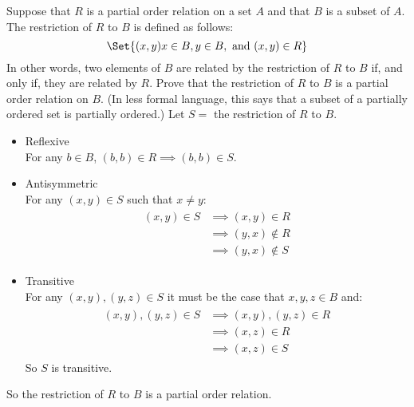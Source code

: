\documentclass[paper=a4, fontsize=11pt]{jhwhw} %
\providecommand\given{} %
\begin{document}
Suppose that $R$ is a partial order relation on a set $A$ and that $B$ is a subset of $A$. The restriction of $R$ to $B$ is defined as follows:
$$\Set{(x, y)\given x\in B, y\in B,\text{ and } (x, y)\in R}$$
In other words, two elements of $B$ are related by the restriction of $R$ to $B$ if, and only if, they are related by $R$. Prove that the restriction of $R$ to $B$ is a partial order relation on $B$. (In less formal language, this says that a subset of a partially ordered set is partially ordered.)
\solution
Let $S =$ the restriction of $R$ to $B$.
\begin{itemize}
    \item Reflexive\\
        For any $b\in B$, $(b, b)\in R\implies (b, b)\in S$.
    \item Antisymmetric\\
        For any $(x, y)\in S$ such that $x\not=y$:
        \begin{align*}
            \begin{split}
                (x, y)\in S &\implies (x, y)\in R\\
                            &\implies (y, x)\not\in R\\
                            &\implies (y, x)\not\in S
            \end{split}
        \end{align*}
    \item Transitive\\
        For any $(x, y), (y, z)\in S$ it must be the case that $x, y, z\in B$ and:
        \begin{align*}
            \begin{split}
                (x, y), (y, z)\in S  &\implies (x, y), (y, z)\in R\\
                                     &\implies (x, z)\in R\\
                                     &\implies (x, z)\in S
            \end{split}
        \end{align*}
        So $S$ is transitive.
\end{itemize}
So the restriction of $R$ to $B$ is a partial order relation.
\end{document}
